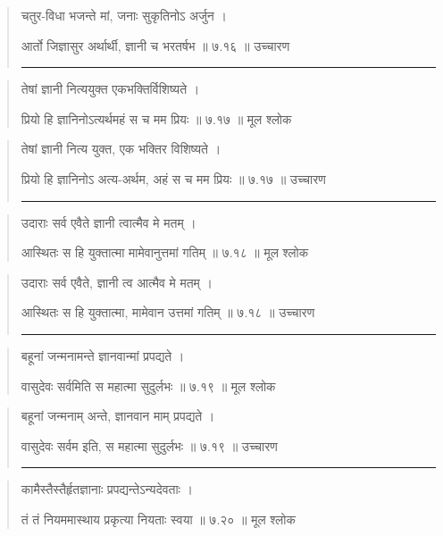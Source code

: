 \begin{quotation}
चतुर-विधा भजन्ते मां, जनाः सुकृतिनोऽ अर्जुन  ।  

आर्तो जिज्ञासुर अर्थार्थी, ज्ञानी च भरतर्षभ  ॥ ७.१६ ॥  उच्चारण

\noindent\rule{16cm}{0.4pt} 
\end{quotation}


\begin{quotation} 
तेषां ज्ञानी नित्ययुक्त एकभक्तिर्विशिष्यते  ।  

प्रियो हि ज्ञानिनोऽत्यर्थमहं स च मम प्रियः  ॥ ७.१७ ॥  मूल श्लोक
\end{quotation}

\begin{quotation}
तेषां ज्ञानी नित्य युक्त, एक भक्तिर विशिष्यते  ।  

प्रियो हि ज्ञानिनोऽ अत्य-अर्थम, अहं स च मम प्रियः  ॥ ७.१७ ॥  उच्चारण

\noindent\rule{16cm}{0.4pt} 
\end{quotation}


\begin{quotation} 
उदाराः सर्व एवैते ज्ञानी त्वात्मैव मे मतम्‌  ।  

आस्थितः स हि युक्तात्मा मामेवानुत्तमां गतिम्‌  ॥ ७.१८ ॥  मूल श्लोक
\end{quotation}

\begin{quotation}
उदाराः सर्व एवैते, ज्ञानी त्व आत्मैव मे मतम्‌  ।  

आस्थितः स हि युक्तात्मा, मामेवान उत्तमां गतिम्‌  ॥ ७.१८ ॥  उच्चारण

\noindent\rule{16cm}{0.4pt} 
\end{quotation}


\begin{quotation} 
बहूनां जन्मनामन्ते ज्ञानवान्मां प्रपद्यते  ।  

वासुदेवः सर्वमिति स महात्मा सुदुर्लभः  ॥ ७.१९ ॥  मूल श्लोक
\end{quotation}

\begin{quotation}
बहूनां जन्मनाम् अन्ते, ज्ञानवान माम् प्रपद्यते  ।  

वासुदेवः सर्वम इति, स महात्मा सुदुर्लभः  ॥ ७.१९ ॥  उच्चारण

\noindent\rule{16cm}{0.4pt} 
\end{quotation}


\begin{quotation} 
कामैस्तैस्तैर्हृतज्ञानाः प्रपद्यन्तेऽन्यदेवताः  ।  

तं तं नियममास्थाय प्रकृत्या नियताः स्वया  ॥ ७.२० ॥  मूल श्लोक
\end{quotation}

